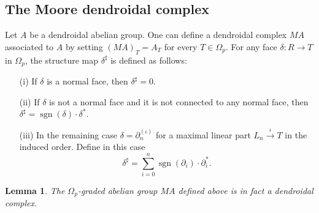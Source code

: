 \documentclass[a4paper]{amsart}
\theoremstyle{plain}
\newtheorem{lem}[thm]{Lemma}
\theoremstyle{definition}
\theoremstyle{remark}
\DeclareMathOperator{\sgn}{sgn}
\newcommand{\rpd}{\Omega_p}
\newcommand{\To}{\longrightarrow}
\numberwithin{equation}{section}
\numberwithin{figure}{section}
\begin{document}
\subsection{The Moore dendroidal complex}
Let $A$ be a dendroidal abelian group. One can define a dendroidal complex $MA$ associated to $A$ by
setting $(MA)_T=A_T$ for every $T\in \rpd$. For any face $\delta\colon R\To T$ in $\rpd$, the structure map $\delta^\sharp$ is defined as
follows:
\begin{itemize}
    \item[{\rm (i)}] If $\delta$ is a normal face, then $\delta^\sharp=0$.
    \item[{\rm (ii)}] If $\delta$ is not a normal face and it is not connected to any normal face, then $\delta^\sharp=\sgn{(\delta)}\cdot\delta^*$.
    \item[{\rm (iii)}] In the remaining case $\delta=\partial^{(\iota)}_n$ for a maximal linear part
          $L_n\stackrel{\iota}{\longrightarrow} T$ in the induced order. Define in this case
          \[
              \delta^\sharp=\sum_{i=0}^n\sgn(\partial_i)\cdot\partial_i^*.
          \]
\end{itemize}
\begin{lem}
    The $\rpd$-graded abelian group $MA$ defined above is in fact a dendroidal complex.
\end{lem}
\end{document}
